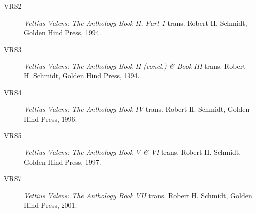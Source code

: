 \begin{description}
\item[VRS2] 
	\textsl{Vettius Valens: The Anthology Book II, Part 1} trans. Robert H. Schmidt, Golden Hind Press, 1994.

\item[VRS3] 
	\textsl{Vettius Valens: The Anthology Book II (concl.) \& Book III} trans. Robert H. Schmidt, Golden Hind Press, 1994.

\item[VRS4] 
	\textsl{Vettius Valens: The Anthology Book IV} trans. Robert H. Schmidt, Golden Hind Press, 1996.

\item[VRS5] 
	\textsl{Vettius Valens: The Anthology Book V \& VI} trans. Robert H. Schmidt, Golden Hind Press, 1997.

\item[VRS7] 
	\textsl{Vettius Valens: The Anthology Book VII} trans. Robert H. Schmidt, Golden Hind Press, 2001.

\end{description}

\newpage